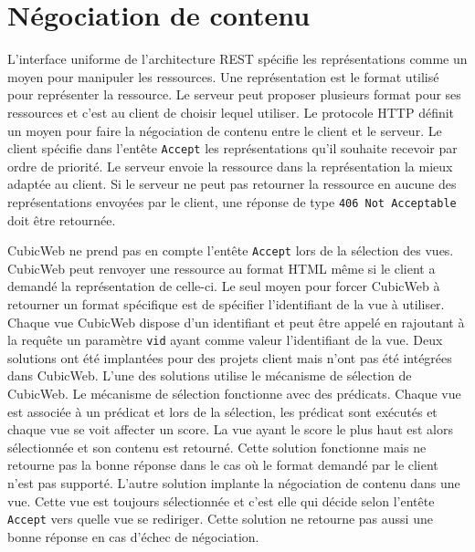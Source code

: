 \section{Négociation de contenu} 
L'interface uniforme de l'architecture REST spécifie les représentations comme 
un moyen pour manipuler les ressources. Une représentation est le format utilisé 
pour représenter la ressource. Le serveur peut proposer plusieurs format pour ses 
ressources et c'est au client de choisir lequel utiliser. Le protocole HTTP définit 
un moyen pour faire la négociation de contenu entre le client et le serveur. Le 
client spécifie dans l'entête \texttt{Accept} les représentations qu'il souhaite 
recevoir par ordre de priorité. Le serveur envoie la ressource dans la 
représentation la mieux adaptée au client. Si le serveur ne peut pas retourner la 
ressource en aucune des représentations envoyées par le client, une réponse de type
\texttt{406~Not~Acceptable} doit être retournée.

CubicWeb ne prend pas en compte l'entête \texttt{Accept} lors de la sélection
des vues. CubicWeb peut renvoyer une ressource au format HTML même si le client
a demandé la représentation  de celle-ci. Le seul moyen
pour forcer CubicWeb à retourner un format spécifique est de spécifier
l'identifiant de la vue à utiliser. Chaque vue CubicWeb dispose d'un
identifiant et peut être appelé en rajoutant à la requête un paramètre
\texttt{vid} ayant comme valeur l'identifiant de la vue. Deux solutions ont été
implantées pour des projets client mais n'ont pas été intégrées dans CubicWeb.
L'une des solutions utilise le mécanisme de sélection de CubicWeb. Le mécanisme
de sélection fonctionne avec des prédicats. Chaque vue est associée à un
prédicat et lors de la sélection, les prédicat sont exécutés et chaque vue se
voit affecter un score. La vue ayant le score le plus haut est alors
sélectionnée et son contenu est retourné. Cette solution fonctionne mais ne
retourne pas la bonne réponse dans le cas où le format demandé par le client
n'est pas supporté. L'autre solution implante la négociation de contenu dans
une vue. Cette vue est toujours sélectionnée et c'est elle qui décide selon
l'entête \texttt{Accept} vers quelle vue se rediriger. Cette solution ne
retourne pas aussi une bonne réponse en cas d'échec de négociation.

